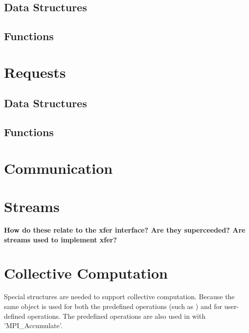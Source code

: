 \documentclass{article}
\begin{document}
\subsection{Data Structures}

\subsection{Functions}


%

\section{Requests}
\subsection{Data Structures}

\subsection{Functions}


\section{Communication}



\section{Streams}
\textbf{How do these relate to the xfer interface?  Are they
superceeded?  Are streams used to implement xfer?}

%
%

\section{Collective Computation}
Special structures are needed to support collective computation.
Because the same object is used for both the predefined operations
(such as ) and for user-defined operations.  The
predefined operations are also used in with 'MPI_Accumulate'.
\end{document}

